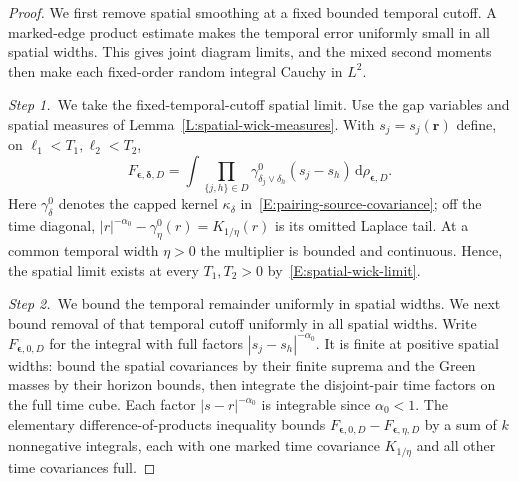 \documentclass[12pt,oneside,openany]{book}
\numberwithin{equation}{section}
\theoremstyle{nogostyle}
\theoremstyle{definition}
\newcommand{\ud}{\,\mathrm{d}}
\begin{document}
\begin{proof}
  We first remove spatial smoothing at a fixed bounded temporal cutoff. A
  marked-edge product estimate makes the temporal error uniformly small in all
  spatial widths. This gives joint diagram limits, and the mixed second
  moments then make each fixed-order random integral Cauchy in $L^2$.


  \medskip
  \noindent\textit{Step 1.~}We take the fixed-temporal-cutoff spatial limit.
  Use the gap variables and spatial measures of
  Lemma~\ref{L:spatial-wick-measures}. With $s_j = s_j(\boldsymbol r)$ define,
  on $\ell_1 < T_1,\ell_2 < T_2$,
  \[
    F_{\boldsymbol\epsilon,\boldsymbol\delta,D}
    =\int\prod_{\{j,h\}\in D}
    \gamma^0_{\delta_j\vee\delta_h}(s_j-s_h)
    \ud\rho_{\boldsymbol\epsilon,D}.
  \]
  Here $\gamma^0_\delta$ denotes the capped kernel $\kappa_\delta$
  in~\eqref{E:pairing-source-covariance}; off the time diagonal,
  $|r|^{-\alpha_0}-\gamma^0_\eta(r)=K_{1/\eta}(r)$ is its omitted Laplace
  tail.
  At a common temporal width $\eta > 0$ the multiplier is bounded and
  continuous. Hence, the spatial limit exists at every $T_1,T_2 > 0$
  by~\eqref{E:spatial-wick-limit}.


  \medskip
  \noindent\textit{Step 2.~}We bound the temporal remainder uniformly in
  spatial widths.
  We next bound removal of that temporal cutoff uniformly in all spatial widths.
  Write $F_{\boldsymbol\epsilon,0,D}$ for the integral with full factors
  $|s_j-s_h|^{-\alpha_0}$. It is finite at positive spatial widths: bound the
  spatial covariances by their finite suprema and the Green masses by their
  horizon bounds, then integrate the disjoint-pair time factors on the full time
  cube. Each factor $|s-r|^{-\alpha_0}$ is integrable since $\alpha_0 < 1$. The
  elementary difference-of-products inequality bounds
  $F_{\boldsymbol\epsilon,0,D}-F_{\boldsymbol\epsilon,\eta,D}$ by a sum of $k$
  nonnegative integrals, each with one marked time covariance $K_{1/\eta}$ and
  all other time covariances full.


\end{proof}
\end{document}
